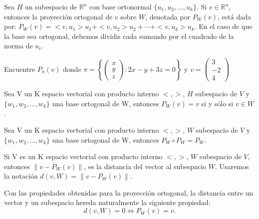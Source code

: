 \begin{defin}Sea $H$ un subespacio de $\mathbb{R}^n$ con base ortonormal $\{ u_1,u_2, \dots , u_k  \}$. Si $v \in \mathbb{R}^n$, entonces la proyección ortogonal de $v$ sobre $W$, denotada por $P_W(v)$, está dada por:
$P_W( v) = <v , u_1>u_1 + <v , u_2>u_2 + \cdots + <v , u_k>u_k$. En el caso de que la base sea ortogonal, debemos dividir cada sumando por el cuadrado de la norma de $u_i$.
\end{defin}


\begin{ejer}
Encuentre $P_\pi (v)$ donde
 $\pi = \left\{ \begin{pmatrix} x \\ y \\ z \end{pmatrix}: 2x-y+3z=0 \right\}$ y $v = \begin{pmatrix} 3 \\ -2 \\ 4 \end{pmatrix}$
\end{ejer}
\begin{prop}
Sea V un K espacio vectorial con producto interno $< , >$, $H$ subespacio de $V$ y $\{ w_1,w_2, \dots, w_k \}$ una base
ortogonal de W, entonces $P_W(v)=v$ si y s\'olo si $v\in W$.
\end{prop}
\begin{cor}
Sea V un K espacio vectorial con producto interno $< , >$, $W$ subespacio de $V$ y $\{ w_1,w_2, \dots, w_k \}$ una base
ortogonal de W, entonces $P_W\circ P_W=P_W$.
\end{cor}




\begin{defin}
Si V es un K espacio vectorial con producto interno $<, > $, $W$ subespacio de $V$, entonces $\|v-P_W(v)\|$, es la distancia del vector al subespacio $W$. Usaremos la notación $d(v,W)=\|v-P_W(v)\|$.
\end{defin}


Con las propiedades obtenidas para la proyección ortogonal, la distancia entre un vector y un
subespacio hereda naturalmente la siguiente propiedad:
$$d(v,W)=0 \Longleftrightarrow P_W(v)=v.$$

